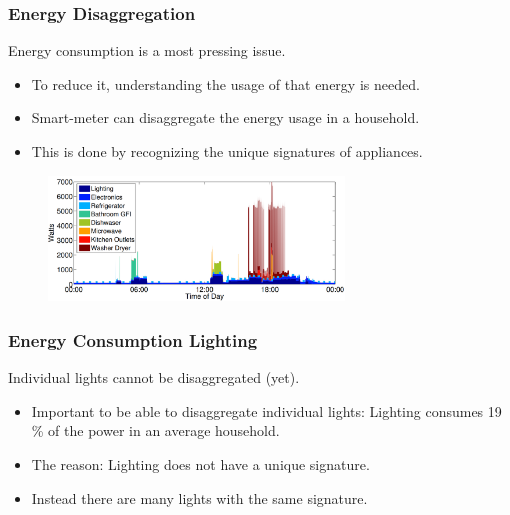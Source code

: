 \documentclass{beamer}
\begin{document}
	\begin{frame}\frametitle{Energy Disaggregation}

		Energy consumption is a most pressing issue.

		\begin{itemize}

			\item To reduce it, understanding the usage of that energy is needed.

			\item Smart-meter can disaggregate the energy usage in a household.

			\item This is done by recognizing the unique signatures of appliances.

		\end{itemize}

		\begin{figure}[t]
			\centering
			\includegraphics[width=0.7\textwidth]{../chapters/introduction-chapters/energy-consumption-house.png}
		\end{figure}


	\end{frame}




	\begin{frame}\frametitle{Energy Consumption Lighting}

		Individual lights cannot be disaggregated (yet).

		\begin{itemize}

			\item Important to be able to disaggregate individual lights: Lighting consumes 19 \% of the power in an average household.

			\item The reason: Lighting does not have a unique signature. %

			\item Instead there are many lights with the same signature.

			

		\end{itemize}


	\end{frame}
\end{document}
